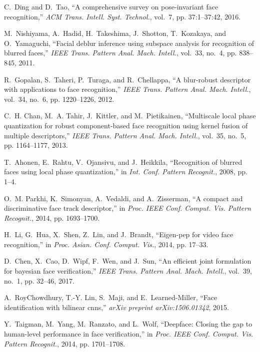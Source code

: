 \documentclass[10pt,journal,cspaper,compsoc]{IEEEtran}
\begin{document}
\begin{thebibliography}{10}
C.~Ding and D.~Tao, ``A comprehensive survey on pose-invariant face
  recognition,'' \emph{ACM Trans. Intell. Syst. Technol.}, vol.~7, pp.
  37:1--37:42, 2016.

M.~Nishiyama, A.~Hadid, H.~Takeshima, J.~Shotton, T.~Kozakaya, and
  O.~Yamaguchi, ``Facial deblur inference using subspace analysis for
  recognition of blurred faces,'' \emph{IEEE Trans. Pattern Anal. Mach.
  Intell.}, vol.~33, no.~4, pp. 838--845, 2011.

R.~Gopalan, S.~Taheri, P.~Turaga, and R.~Chellappa, ``A blur-robust descriptor
  with applications to face recognition,'' \emph{IEEE Trans. Pattern Anal.
  Mach. Intell.}, vol.~34, no.~6, pp. 1220--1226, 2012.

C.~H. Chan, M.~A. Tahir, J.~Kittler, and M.~Pietikainen, ``Multiscale local
  phase quantization for robust component-based face recognition using kernel
  fusion of multiple descriptors,'' \emph{IEEE Trans. Pattern Anal. Mach.
  Intell.}, vol.~35, no.~5, pp. 1164--1177, 2013.

T.~Ahonen, E.~Rahtu, V.~Ojansivu, and J.~Heikkila, ``Recognition of blurred
  faces using local phase quantization,'' in \emph{Int. Conf. Pattern
  Recognit.}, 2008, pp. 1--4.

O.~M. Parkhi, K.~Simonyan, A.~Vedaldi, and A.~Zisserman, ``A compact and
  discriminative face track descriptor,'' in \emph{Proc. IEEE Conf. Comput.
  Vis. Pattern Recognit.}, 2014, pp. 1693--1700.

H.~Li, G.~Hua, X.~Shen, Z.~Lin, and J.~Brandt, ``Eigen-pep for video face
  recognition,'' in \emph{Proc. Asian. Conf. Comput. Vis.}, 2014, pp. 17--33.

D.~Chen, X.~Cao, D.~Wipf, F.~Wen, and J.~Sun, ``An efficient joint formulation
  for bayesian face verification,'' \emph{IEEE Trans. Pattern Anal. Mach.
  Intell.}, vol.~39, no.~1, pp. 32--46, 2017.

A.~RoyChowdhury, T.-Y. Lin, S.~Maji, and E.~Learned-Miller, ``Face
  identification with bilinear cnns,'' \emph{arXiv preprint arXiv:1506.01342},
  2015.

Y.~Taigman, M.~Yang, M.~Ranzato, and L.~Wolf, ``Deepface: Closing the gap to
  human-level performance in face verification,'' in \emph{Proc. IEEE Conf.
  Comput. Vis. Pattern Recognit.}, 2014, pp. 1701--1708.


\end{thebibliography}
\end{document}
